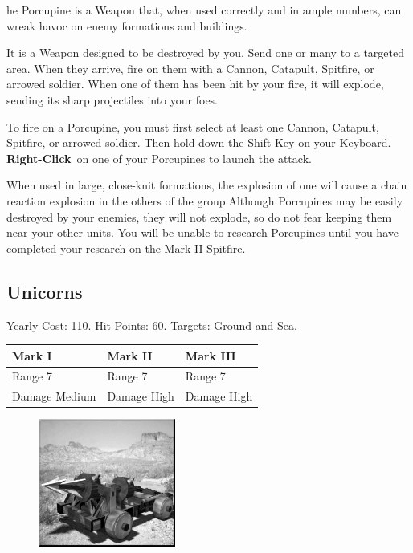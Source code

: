 he Porcupine is a Weapon that, when used correctly and in ample numbers, can wreak havoc on enemy formations and buildings.

It is a Weapon designed to be destroyed by you. Send one or many to a targeted area. When they arrive, fire on them with a Cannon, Catapult, Spitfire, or arrowed soldier. When one of them has been hit by your fire, it will explode, sending its sharp projectiles into your foes.

To fire on a Porcupine, you must first select at least one Cannon, Catapult, Spitfire, or arrowed soldier. Then hold down the Shift Key on your Keyboard. \textbf{Right-Click} on one of your Porcupines to launch the attack.

When used in large, close-knit formations, the explosion of one will cause a chain reaction explosion in the others of the group.Although Porcupines may be easily destroyed by your enemies, they will not explode, so do not fear keeping them near your other units. You will be unable to research Porcupines until you have completed your research on the Mark II Spitfire.

\clearpage

\subsection{Unicorns}


\begin{center}
	Yearly Cost: 110. Hit-Points: 60. Targets: Ground and Sea.
\end{center}

\begin{tabular}{ | p{1.3in} | p{1.3in} | p{1.3in} |}
	\hline
	\textbf{Mark I}	& \textbf{Mark II} & \textbf{Mark III} \\ \hline
	Range 7	& Range 7 & Range 7 \\ \hline
	Damage Medium	& Damage High & Damage High \\ \hline
\end{tabular}

\begin{figure}
	\vspace{-20pt}
	\begin{center}
		\includegraphics[width=0.4\textwidth]{Aunicorn}
	\end{center}
\end{figure}

